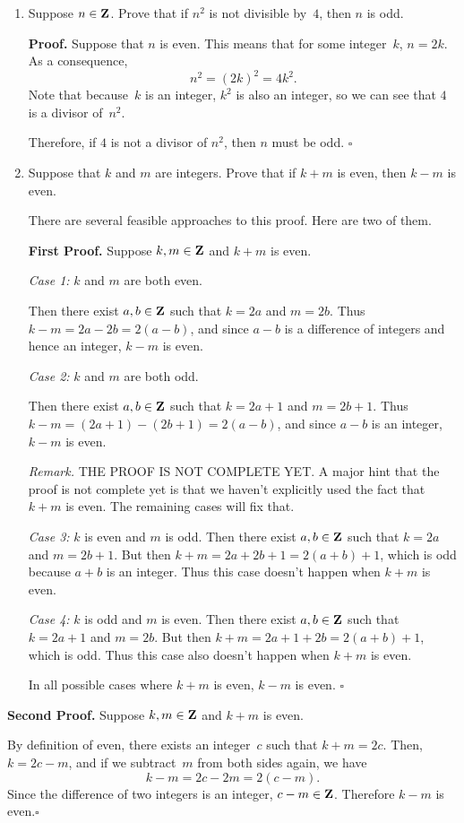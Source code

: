 \documentclass[12pt,letterpaper]{report}
\def\Z{{\bf Z}}
\begin{document}
\begin{enumerate}
Therefore, we conclude that if $xy$ is irrational, then~$y$ is irrational.\hfill $\square$

\item  Suppose $n\in\Z$.
Prove that if $n^2$ is not divisible by~$4$, then $n$ is odd.

\smallskip
\noindent\textbf{Proof.}
Suppose that $n$ is even.  This means that for some integer~$k$, $n = 2k$.
As a consequence, $$n^2 = (2k)^2 = 4k^2.$$
Note that because~$k$ is an integer, $k^2$ is also an integer, so we can see that $4$ is a divisor of~$n^2$.

Therefore, if $4$ is not a divisor of $n^2$, then $n$ must be odd. \hfill $\square$

\newpage

\item  Suppose that $k$ and $m$ are integers.  Prove that if $k + m$ is even, then $k - m$ is even.

There are several feasible approaches to this proof.  Here are two of them.

\smallskip
\noindent\textbf{First Proof.} 
Suppose $k,m\in\Z$ and $k + m$ is even.

\noindent\textit{Case 1:} $k$ and $m$ are both even.

Then there exist $a,b\in\Z$ such that $k = 2a$ and $m = 2b$.  Thus $k - m = 2a - 2b = 2(a - b)$,
and since $a-b$ is a difference of integers and hence an integer, $k - m$ is even.

\noindent\textit{Case 2:} $k$ and $m$ are both odd.

Then there exist $a,b\in\Z$ such that $k = 2a + 1$ and $m = 2b + 1$.  Thus $k - m = (2a + 1) - (2b + 1) = 2(a - b)$,
and since $a-b$ is an integer, $k - m$ is even.

\bigskip

\textit{Remark.}  THE PROOF IS NOT COMPLETE YET.  A major hint that the proof is not complete yet 
is that we haven't explicitly used the fact that $k + m$ is even.  The remaining cases will fix that.

\bigskip

\noindent\textit{Case 3:} $k$ is even and $m$ is odd.
Then there exist $a,b\in\Z$ such that $k = 2a$ and $m = 2b + 1$.  But then $k + m = 2a + 2b + 1 = 
2(a + b) + 1$, which is odd because $a+b$ is an integer.  Thus this case doesn't happen when $k + m$ is even.

\noindent\textit{Case 4:} $k$ is odd and $m$ is even.
Then there exist $a,b\in\Z$ such that $k = 2a + 1$ and $m = 2b$.  But then $k + m = 2a + 1 + 2b = 
2(a + b) + 1$, which is odd.  Thus this case also doesn't happen when $k + m$ is even.

In all possible cases where $k + m$ is even, $k-m$ is even.  \hfill $\square$

\end{enumerate}

\smallskip
\noindent\textbf{Second Proof.} 
Suppose $k,m\in\Z$ and $k + m$ is even.

By definition of even, there exists an integer~$c$ such that $k + m = 2c.$
Then, $k = 2c - m$, and if we subtract~$m$ from both sides again, we have
$$k - m = 2c - 2m = 2(c - m).$$
Since the difference of two integers is an integer, $c-m\in\Z$.  Therefore $k - m$ is even.\hfill $\square$
\end{document}

